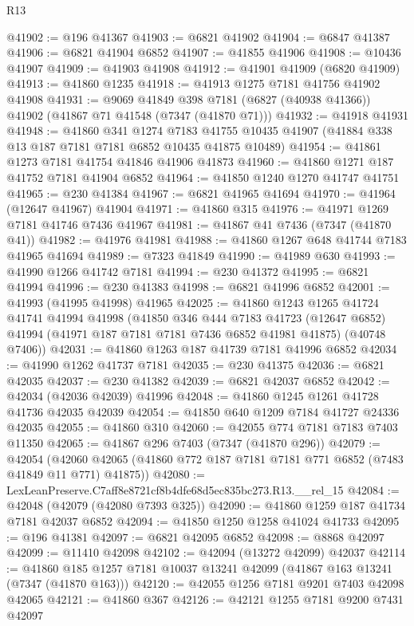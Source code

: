 \begin{lexlean}{R13}
\begin{coremodule}
@41902 := @196 @41367
@41903 := @6821 @41902
@41904 := @6847 @41387
@41906 := @6821 @41904 @6852
@41907 := @41855 @41906
@41908 := @10436 @41907
@41909 := @41903 @41908
@41912 := @41901 @41909 (@6820 @41909)
@41913 := @41860 @1235
@41918 := @41913 @1275 @7181 @41756 @41902 @41908
@41931 := @9069
    @41849
    @398
    @7181
    (@6827 (@40938 @41366))
    @41902
    (@41867 @71 @41548 (@7347 (@41870 @71)))
@41932 := @41918 @41931
@41948 := @41860
    @341
    @1274
    @7183
    @41755
    @10435
    @41907
    (@41884 @338 @13 @187 @7181 @7181 @6852 @10435 @41875 @10489)
@41954 := @41861 @1273 @7181 @41754 @41846 @41906 @41873
@41960 := @41860 @1271 @187 @41752 @7181 @41904 @6852
@41964 := @41850 @1240 @1270 @41747 @41751
@41965 := @230 @41384
@41967 := @6821 @41965 @41694
@41970 := @41964 (@12647 @41967) @41904
@41971 := @41860 @315
@41976 := @41971 @1269 @7181 @41746 @7436 @41967
@41981 := @41867 @41 @7436 (@7347 (@41870 @41))
@41982 := @41976 @41981
@41988 := @41860 @1267 @648 @41744 @7183 @41965 @41694
@41989 := @7323 @41849
@41990 := @41989 @630
@41993 := @41990 @1266 @41742 @7181
@41994 := @230 @41372
@41995 := @6821 @41994
@41996 := @230 @41383
@41998 := @6821 @41996 @6852
@42001 := @41993 (@41995 @41998) @41965
@42025 := @41860
    @1243
    @1265
    @41724
    @41741
    @41994
    @41998
    (@41850
      @346
      @444
      @7183
      @41723
      (@12647 @6852)
      @41994
      (@41971 @187 @7181 @7181 @7436 @6852 @41981 @41875)
      (@40748 @7406))
@42031 := @41860 @1263 @187 @41739 @7181 @41996 @6852
@42034 := @41990 @1262 @41737 @7181
@42035 := @230 @41375
@42036 := @6821 @42035
@42037 := @230 @41382
@42039 := @6821 @42037 @6852
@42042 := @42034 (@42036 @42039) @41996
@42048 := @41860 @1245 @1261 @41728 @41736 @42035 @42039
@42054 := @41850 @640 @1209 @7184 @41727 @24336 @42035
@42055 := @41860 @310
@42060 := @42055 @774 @7181 @7183 @7403 @11350
@42065 := @41867 @296 @7403 (@7347 (@41870 @296))
@42079 := @42054
    (@42060 @42065 (@41860 @772 @187 @7181 @7181 @771 @6852 (@7483 @41849 @11 @771) @41875))
@42080 := LexLeanPreserve.C7aff8e8721cf8b4dfe68d5ec835bc273.R13.__rel_15
@42084 := @42048 (@42079 (@42080 @7393 @325))
@42090 := @41860 @1259 @187 @41734 @7181 @42037 @6852
@42094 := @41850 @1250 @1258 @41024 @41733
@42095 := @196 @41381
@42097 := @6821 @42095 @6852
@42098 := @8868 @42097
@42099 := @11410 @42098
@42102 := @42094 (@13272 @42099) @42037
@42114 := @41860 @185 @1257 @7181 @10037 @13241 @42099 (@41867 @163 @13241 (@7347 (@41870 @163)))
@42120 := @42055 @1256 @7181 @9201 @7403 @42098 @42065
@42121 := @41860 @367
@42126 := @42121 @1255 @7181 @9200 @7431 @42097

\end{coremodule}
\end{lexlean}
